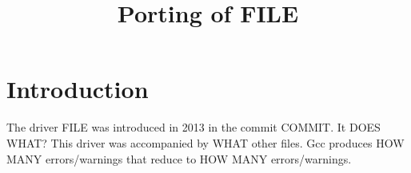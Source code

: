 \documentclass{article}
\title{Porting of FILE}
\begin{document}
\maketitle

\section{Introduction}

The driver FILE was introduced in 2013 in the commit
COMMIT.  It DOES WHAT?   This driver was accompanied by WHAT other files.
Gcc produces HOW MANY errors/warnings that reduce to HOW MANY errors/warnings.
\end{document}
